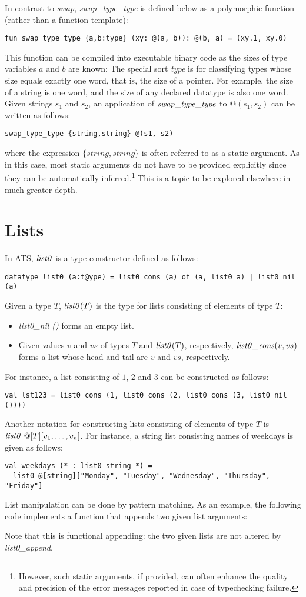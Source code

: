 In contrast to {\it swap}, {\it swap\_type\_type} is defined below as a
polymorphic function (rather than a function template):
\begin{verbatim}
fun swap_type_type {a,b:type} (xy: @(a, b)): @(b, a) = (xy.1, xy.0)
\end{verbatim}
This function can be compiled into executable binary code as the sizes of
type variables $a$ and $b$ are known: The special sort {\it type} is for
classifying types whose size equals exactly one word, that is, the size of
a pointer. For example, the size of a string is one word, and the size of
any declared datatype is also one word.  Given strings $s_1$ and $s_2$, an
application of ${\it swap\_type\_type}$ to $@(s_1, s_2)$ can be written as
follows:
\begin{center}
\texttt{swap\_type\_type \{string,string\} @(s1, s2)}
\end{center}
where the expression $\{string,string\}$ is often referred to as a static
argument. As in this case, most static arguments do not have to be provided
explicitly since they can be automatically inferred.\footnote{However, such
static arguments, if provided, can often enhance the quality and precision
of the error messages reported in case of typechecking failure.} This is a
topic to be explored elsewhere in much greater depth.

\section{Lists}
In ATS, ${\it list0}$ is a type constructor defined as follows:
\begin{verbatim}
datatype list0 (a:t@ype) = list0_cons (a) of (a, list0 a) | list0_nil (a) 
\end{verbatim}
Given a type $T$, ${\it list0}(T)$ is the type for lists consisting of
elements of type $T$:
\begin{itemize}
\item {\it list0\_nil ()} forms an empty list.
\item Given values $v$ and $vs$ of types $T$ and ${\it list0}(T)$,
respectively, ${\it list0\_cons}(v, vs)$ forms a list whose head and tail
are $v$ and $vs$, respectively.
\end{itemize}
For instance, a list consisting of $1$, $2$ and $3$ can be constructed as
follows:
\begin{verbatim}
val lst123 = list0_cons (1, list0_cons (2, list0_cons (3, list0_nil ())))
\end{verbatim}
Another notation for constructing lists consisting of elements of type
$T$ is ${\it list0}~@[T][v_1,\ldots,v_n]$. For instance, a string list
consisting names of weekdays is given as follows:
\begin{verbatim}
val weekdays (* : list0 string *) =
  list0 @[string]["Monday", "Tuesday", "Wednesday", "Thursday", "Friday"]
\end{verbatim}
List manipulation can be done by pattern matching. As an example, the
following code implements a function that appends two given list arguments:

Note that this is functional appending: the two given lists are not altered
by {\it list0\_append}.

